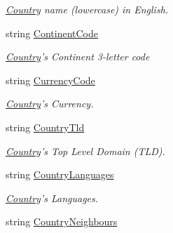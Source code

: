 \begin{DoxyCompactItemize}
\begin{DoxyCompactList}\small\item\em \hyperlink{class_thecallr_api_1_1_objects_1_1_misc_1_1_country}{Country} name (lowercase) in English. \end{DoxyCompactList}\item 
string \hyperlink{class_thecallr_api_1_1_objects_1_1_misc_1_1_country_a4c1b15a803f665cc4613caa1d4a23dc4}{Continent\+Code}
\begin{DoxyCompactList}\small\item\em \hyperlink{class_thecallr_api_1_1_objects_1_1_misc_1_1_country}{Country}'s Continent 3-\/letter code \end{DoxyCompactList}\item 
string \hyperlink{class_thecallr_api_1_1_objects_1_1_misc_1_1_country_a4d6c39835cde4c1ba5f6f965bb7f50fb}{Currency\+Code}
\begin{DoxyCompactList}\small\item\em \hyperlink{class_thecallr_api_1_1_objects_1_1_misc_1_1_country}{Country}'s Currency. \end{DoxyCompactList}\item 
string \hyperlink{class_thecallr_api_1_1_objects_1_1_misc_1_1_country_a16fc0547d9f55b21c13c190f2dea6325}{Country\+Tld}
\begin{DoxyCompactList}\small\item\em \hyperlink{class_thecallr_api_1_1_objects_1_1_misc_1_1_country}{Country}'s Top Level Domain (T\+L\+D). \end{DoxyCompactList}\item 
string \hyperlink{class_thecallr_api_1_1_objects_1_1_misc_1_1_country_afa4bcb2e1475731e0f8a52cbdd4bc587}{Country\+Languages}
\begin{DoxyCompactList}\small\item\em \hyperlink{class_thecallr_api_1_1_objects_1_1_misc_1_1_country}{Country}'s Languages. \end{DoxyCompactList}\item 
string \hyperlink{class_thecallr_api_1_1_objects_1_1_misc_1_1_country_ae82d3d4498f1d42d328170943a50ade3}{Country\+Neighbours}

\end{DoxyCompactItemize}
